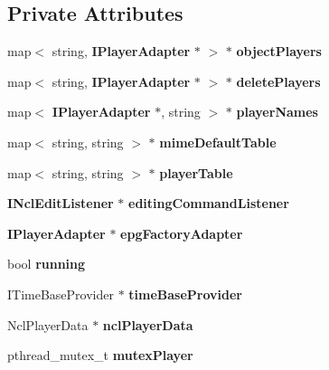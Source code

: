 \subsection*{Private Attributes}
\begin{CompactItemize}
\item 
map$<$ string, {\bf IPlayerAdapter} $\ast$ $>$ $\ast$ {\bf objectPlayers}\label{classbr_1_1pucrio_1_1telemidia_1_1ginga_1_1ncl_1_1adapters_1_1PlayerAdapterManager_12e57ff8c01b5659749a5ff5ce47557b}

\item 
map$<$ string, {\bf IPlayerAdapter} $\ast$ $>$ $\ast$ {\bf deletePlayers}\label{classbr_1_1pucrio_1_1telemidia_1_1ginga_1_1ncl_1_1adapters_1_1PlayerAdapterManager_c48e6dcc803333cd1e6dca483b97a0e7}

\item 
map$<$ {\bf IPlayerAdapter} $\ast$, string $>$ $\ast$ {\bf playerNames}\label{classbr_1_1pucrio_1_1telemidia_1_1ginga_1_1ncl_1_1adapters_1_1PlayerAdapterManager_ba35667c5c96c58aba4275bbda87d0f0}

\item 
map$<$ string, string $>$ $\ast$ {\bf mimeDefaultTable}\label{classbr_1_1pucrio_1_1telemidia_1_1ginga_1_1ncl_1_1adapters_1_1PlayerAdapterManager_4d31037041fd6a071cefdd5e38c86d8a}

\item 
map$<$ string, string $>$ $\ast$ {\bf playerTable}\label{classbr_1_1pucrio_1_1telemidia_1_1ginga_1_1ncl_1_1adapters_1_1PlayerAdapterManager_bc2f0530aec6abd9ab1f018686bab0af}

\item 
{\bf INclEditListener} $\ast$ {\bf editingCommandListener}\label{classbr_1_1pucrio_1_1telemidia_1_1ginga_1_1ncl_1_1adapters_1_1PlayerAdapterManager_03c0933ef4583b4d5d6bffee883712ae}

\item 
{\bf IPlayerAdapter} $\ast$ {\bf epgFactoryAdapter}\label{classbr_1_1pucrio_1_1telemidia_1_1ginga_1_1ncl_1_1adapters_1_1PlayerAdapterManager_6667f2c1eb8a2ff1f8614714c88d733b}

\item 
bool {\bf running}\label{classbr_1_1pucrio_1_1telemidia_1_1ginga_1_1ncl_1_1adapters_1_1PlayerAdapterManager_36f7b6be7108281af77939ceaec42fd6}

\item 
ITimeBaseProvider $\ast$ {\bf timeBaseProvider}\label{classbr_1_1pucrio_1_1telemidia_1_1ginga_1_1ncl_1_1adapters_1_1PlayerAdapterManager_a768d0b9325a7db85149852491c20fe1}

\item 
NclPlayerData $\ast$ {\bf nclPlayerData}\label{classbr_1_1pucrio_1_1telemidia_1_1ginga_1_1ncl_1_1adapters_1_1PlayerAdapterManager_86e30b92a6edf1adbd512221e70a9b91}

\item 
pthread\_\-mutex\_\-t {\bf mutexPlayer}\label{classbr_1_1pucrio_1_1telemidia_1_1ginga_1_1ncl_1_1adapters_1_1PlayerAdapterManager_e56a5e489dc1e7abc14252f946fa82a6}

\end{CompactItemize}


